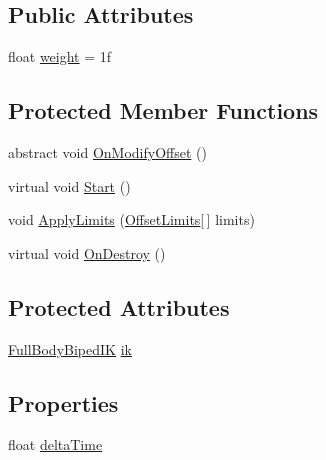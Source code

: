 \subsection*{Public Attributes}
\begin{DoxyCompactItemize}
\item 
float \mbox{\hyperlink{class_root_motion_1_1_final_i_k_1_1_offset_modifier_a3a2cd2134e8a197e6a77b48fcf9aa5d4}{weight}} = 1f
\end{DoxyCompactItemize}
\subsection*{Protected Member Functions}
\begin{DoxyCompactItemize}
\item 
abstract void \mbox{\hyperlink{class_root_motion_1_1_final_i_k_1_1_offset_modifier_a777e9ffb4afca3d8647959a79a1120bb}{On\+Modify\+Offset}} ()
\item 
virtual void \mbox{\hyperlink{class_root_motion_1_1_final_i_k_1_1_offset_modifier_a10d007a731b89218a14935a09552cb77}{Start}} ()
\item 
void \mbox{\hyperlink{class_root_motion_1_1_final_i_k_1_1_offset_modifier_a5c61c7f0be864ad1a3bcc371feec1f53}{Apply\+Limits}} (\mbox{\hyperlink{class_root_motion_1_1_final_i_k_1_1_offset_modifier_1_1_offset_limits}{Offset\+Limits}}\mbox{[}$\,$\mbox{]} limits)
\item 
virtual void \mbox{\hyperlink{class_root_motion_1_1_final_i_k_1_1_offset_modifier_ac407dea9830e075f9ea4511ba4811d69}{On\+Destroy}} ()
\end{DoxyCompactItemize}
\subsection*{Protected Attributes}
\begin{DoxyCompactItemize}
\item 
\mbox{\hyperlink{class_root_motion_1_1_final_i_k_1_1_full_body_biped_i_k}{Full\+Body\+Biped\+IK}} \mbox{\hyperlink{class_root_motion_1_1_final_i_k_1_1_offset_modifier_a6423c7ff9da3ad0208cc85524da97ec4}{ik}}
\end{DoxyCompactItemize}
\subsection*{Properties}
\begin{DoxyCompactItemize}
\item 
float \mbox{\hyperlink{class_root_motion_1_1_final_i_k_1_1_offset_modifier_ac5aeb27ca30313e6791867cbd4109940}{delta\+Time}}
\end{DoxyCompactItemize}



